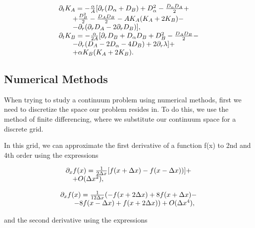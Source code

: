 \begin{align}
    \begin{array}{@{}l@{}}
        \partial_t K_A = -\frac{\alpha}{A} [ \partial_r(D_\alpha + D_B) + D_\alpha^2 - \frac{D_\alpha D_A}{2} +\\ \qquad+ \frac{D_B^2}{2} - \frac{D_A D_B}{2} - A K_A(K_A + 2 K_B) -\\ \qquad- \partial_r(\partial_r D_A - 2 \partial_r D_B) ],
        \\
        \partial_t K_B = -\frac{\alpha}{2A} [ \partial_r D_B + D_\alpha D_B + D_B^2 - \frac{D_A D_B}{2} -\\ \qquad- \partial_r(D_A - 2 D_\alpha - 4 D_B) + 2 \partial_r \lambda] +\\ \qquad + \alpha K_B(K_A + 2K_B).
    \end{array}
    \label{eq:adm_origin}
\end{align}

\subsection{Numerical Methods}

When trying to study a continuum problem using numerical methods, first we need to discretize the space our problem resides in. To do this, we use the method of finite differencing, where we substitute our continuum space for a discrete grid.

In this grid, we can approximate the first derivative of a function f(x) to 2nd and 4th order using the expressions 

\begin{align}
    \begin{array}{@{}l@{}}
        \partial_x f(x) = \frac{1}{2\Delta x}[f(x+\Delta x) - f(x-\Delta x))] + \\ \quad + O(\Delta x^2),
    \end{array}
    \label{eq:first_deriv_2nd}
\end{align}

\begin{align}
    \begin{array}{@{}l@{}}
        \partial_x f(x) = \frac{1}{12 \Delta x} ( -f(x+2\Delta x) + 8 f(x+\Delta x) - \\ \qquad - 8 f(x- \Delta x) + f(x + 2 \Delta x) ) + O(\Delta x^4),
    \end{array}
    \label{eq:first_deriv_4th}
\end{align}

\noindent
and the second derivative using the expressions 

